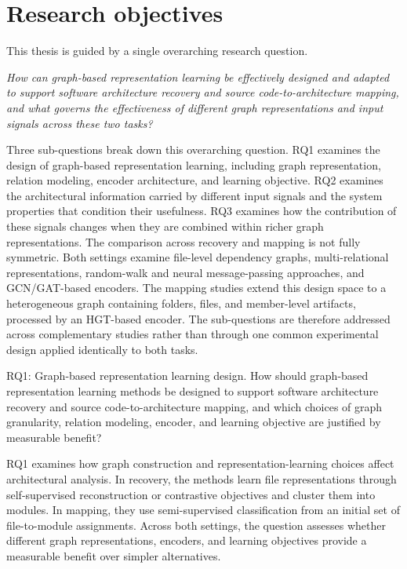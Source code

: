 \section{Research objectives}
\label{sec:research_objectives}

This thesis is guided by a single overarching research question.

\begin{GrayBox}{}
\emph{How can graph-based representation learning be effectively designed and adapted to support software architecture recovery and source code-to-architecture mapping, and what governs the effectiveness of different graph representations and input signals across these two tasks?}
\end{GrayBox}

Three sub-questions break down this overarching question. RQ1 examines the design of graph-based representation learning, including graph representation, relation modeling, encoder architecture, and learning objective. RQ2 examines the architectural information carried by different input signals and the system properties that condition their usefulness. RQ3 examines how the contribution of these signals changes when they are combined within richer graph representations. The comparison across recovery and mapping is not fully symmetric. Both settings examine file-level dependency graphs, multi-relational representations, random-walk and neural message-passing approaches, and GCN/GAT-based encoders. The mapping studies extend this design space to a heterogeneous graph containing folders, files, and member-level artifacts, processed by an HGT-based encoder. The sub-questions are therefore addressed across complementary studies rather than through one common experimental design applied identically to both tasks.

\begin{GrayBox}{RQ1: Graph-based representation learning design.}
How should graph-based representation learning methods be designed to support software architecture recovery and source code-to-architecture mapping, and which choices of graph granularity, relation modeling, encoder, and learning objective are justified by measurable benefit?
\end{GrayBox}

RQ1 examines how graph construction and representation-learning choices affect architectural analysis. In recovery, the methods learn file representations through self-supervised reconstruction or contrastive objectives and cluster them into modules. In mapping, they use semi-supervised classification from an initial set of file-to-module assignments. Across both settings, the question assesses whether different graph representations, encoders, and learning objectives provide a measurable benefit over simpler alternatives.

